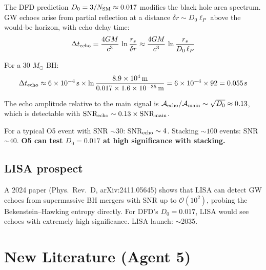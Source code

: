 \documentclass[11pt,a4paper]{article}
\begin{document}
The DFD prediction $D_0 = 3/N_{\rm SM} \approx 0.017$ modifies the black hole area spectrum. GW echoes arise from partial reflection at a distance $\delta r \sim D_0 \ell_P$ above the would-be horizon, with echo delay time:
\begin{equation}
\Delta t_{\rm echo} = \frac{4GM}{c^3}\,\ln\frac{r_s}{\delta r} \approx \frac{4GM}{c^3}\,\ln\frac{r_s}{D_0\,\ell_P}
\end{equation}

For a 30 $M_\odot$ BH:
\begin{equation}
\Delta t_{\rm echo} \approx 6 \times 10^{-4}\,\text{s} \times \ln\frac{8.9 \times 10^4\,\text{m}}{0.017 \times 1.6 \times 10^{-35}\,\text{m}} = 6 \times 10^{-4} \times 92 = 0.055\,\text{s}
\end{equation}

The echo amplitude relative to the main signal is $\mathcal{A}_{\rm echo}/\mathcal{A}_{\rm main} \sim \sqrt{D_0} \approx 0.13$, which is detectable with $\text{SNR}_{\rm echo} \sim 0.13 \times \text{SNR}_{\rm main}$.

For a typical O5 event with SNR $\sim 30$: SNR$_{\rm echo} \sim 4$. Stacking $\sim 100$ events: SNR $\sim 40$. \textbf{O5 can test $D_0 = 0.017$ at high significance with stacking.}

\subsection{LISA prospect}

A 2024 paper (Phys.\ Rev.\ D, arXiv:2411.05645) shows that LISA can detect GW echoes from supermassive BH mergers with SNR up to $\mathcal{O}(10^2)$, probing the Bekenstein--Hawking entropy directly. For DFD's $D_0 = 0.017$, LISA would see echoes with extremely high significance. LISA launch: $\sim$2035.

\section{New Literature (Agent 5)}
\end{document}
